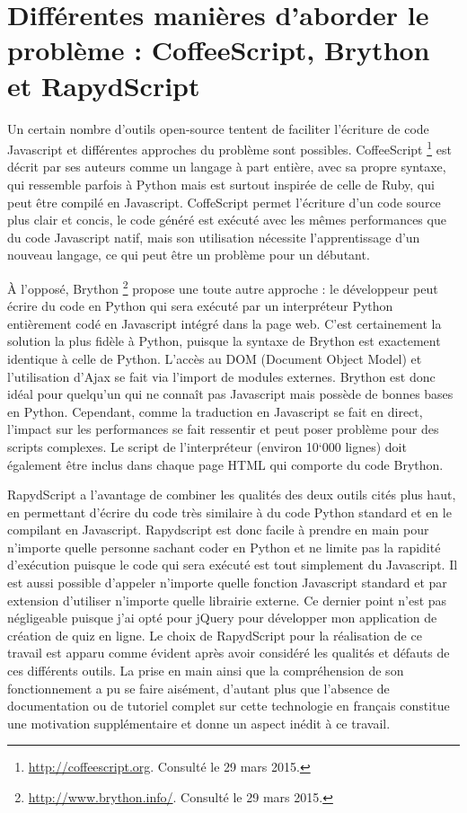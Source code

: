 \documentclass[a4,10pt,french]{sphinxmanual}
\begin{document}
\section{Différentes manières d'aborder le problème : CoffeeScript, Brython et RapydScript}
\label{rapydscript:differentes-manieres-d-aborder-le-probleme-coffeescript-brython-et-rapydscript}
Un certain nombre d'outils open-source tentent de faciliter l'écriture de code Javascript et différentes approches du problème sont possibles. CoffeeScript \footnote{
\href{http://coffeescript.org}{http://coffeescript.org}. Consulté le 29 mars 2015.
} est décrit par ses auteurs comme un langage à part entière, avec sa propre syntaxe, qui ressemble parfois à Python mais est surtout inspirée de celle de Ruby, qui peut être compilé en Javascript. CoffeScript permet l'écriture d'un code source plus clair et concis, le code généré est exécuté avec les mêmes performances que du code Javascript natif, mais son utilisation nécessite l'apprentissage d'un nouveau langage, ce qui peut être un problème pour un débutant.

À l'opposé, Brython \footnote{
\href{http://www.brython.info/}{http://www.brython.info/}. Consulté le 29 mars 2015.
} propose une toute autre approche : le développeur peut écrire du code en Python qui sera exécuté par un interpréteur Python entièrement codé en Javascript intégré dans la page web. C'est certainement la solution la plus fidèle à Python, puisque la syntaxe de Brython est exactement identique à celle de Python. L'accès au DOM (Document Object Model) et l'utilisation d'Ajax se fait via l'import de modules externes. Brython est donc idéal pour quelqu'un qui ne connaît pas Javascript mais possède de bonnes bases en Python. Cependant, comme la traduction en Javascript se fait en direct, l'impact sur les performances se fait ressentir et peut poser problème pour des scripts complexes. Le script de l'interpréteur (environ 10`000 lignes) doit également être inclus dans chaque page HTML qui comporte du code Brython.

RapydScript a l'avantage de combiner les qualités des deux outils cités plus haut, en permettant d'écrire du code très similaire à du code Python standard et en le compilant en Javascript. Rapydscript est donc facile à prendre en main pour n'importe quelle personne sachant coder en Python et ne limite pas la rapidité d'exécution puisque le code qui sera exécuté est tout simplement du Javascript. Il est aussi possible d'appeler n'importe quelle fonction Javascript standard et par extension d'utiliser n'importe quelle librairie externe. Ce dernier point n'est pas négligeable puisque j'ai opté pour jQuery pour développer mon application de création de quiz en ligne. Le choix de RapydScript pour la réalisation de ce travail est apparu comme évident après avoir considéré les qualités et défauts de ces différents outils. La prise en main ainsi que la compréhension de son fonctionnement a pu se faire aisément, d'autant plus que l'absence de documentation ou de tutoriel complet sur cette technologie en français constitue une motivation supplémentaire et donne un aspect inédit à ce travail.
\end{document}
